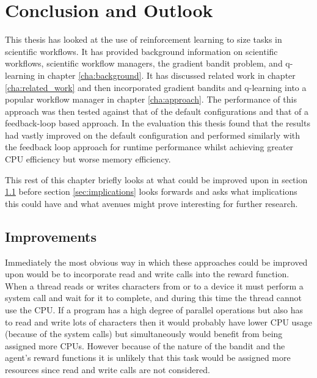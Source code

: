 
\cleardoublepage
\chapter{Conclusion and Outlook}
\label{cha:conclusion}

This thesis has looked at the use of reinforcement learning to size tasks in scientific workflows. It has provided background information on scientific workflows, scientific workflow managers, the gradient bandit problem, and q-learning in chapter \ref{cha:background}. It has discussed related work in chapter \ref{cha:related_work} and then incorporated gradient bandits and q-learning into a popular workflow manager in chapter \ref{cha:approach}. The performance of this approach was then tested against that of the default configurations and that of a feedback-loop based approach. In the evaluation this thesis found that the results had vastly improved on the default configuration and performed similarly with the feedback loop approach for runtime performance whilst achieving greater CPU efficiency but worse memory efficiency.

This rest of this chapter briefly looks at what could be improved upon in section \ref{sec:improvements} before section \ref{sec:implications} looks forwards and asks what implications this could have and what avenues might prove interesting for further research.

\section{Improvements}
\label{sec:improvements}

Immediately the most obvious way in which these approaches could be improved upon would be to incorporate read and write calls into the reward function. When a thread reads or writes characters from or to a device it must perform a system call and wait for it to complete, and during this time the thread cannot use the CPU. If a program has a high degree of parallel operations but also has to read and write lots of characters then it would probably have lower CPU usage (because of the system calls) but simultaneously would benefit from being assigned more CPUs. However because of the nature of the bandit and the agent’s reward functions it is unlikely that this task would be assigned more resources since read and write calls are not considered.

